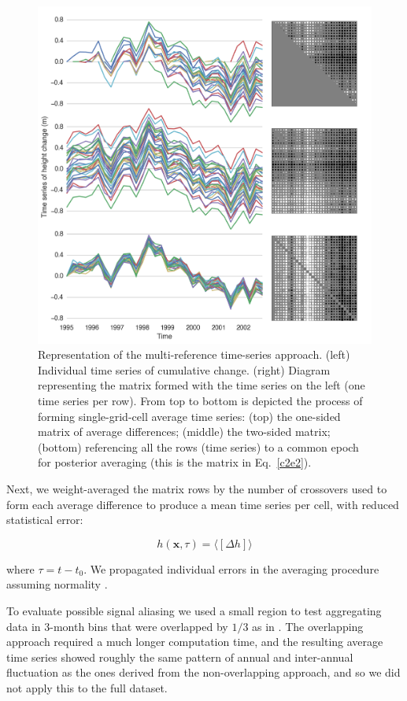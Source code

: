 \begin{figure}[!ht]
  \centering
  \includegraphics[width=.85\textwidth]{img/multiref_matrix_v4.png}
  \caption[Representation of the multi-reference time-series approach]{
  \ssp \footnotesize
  Representation of the multi-reference time-series approach. (left) Individual time series of cumulative change. (right) Diagram representing the matrix formed with the time series on the left (one time series per row). From top to bottom is depicted the process of forming single-grid-cell average time series: (top) the one-sided matrix of average differences; (middle) the two-sided matrix; (bottom) referencing all the rows (time series) to a common epoch for posterior averaging (this is the matrix in Eq.~\ref{c2e2}).} 
  \label{c2f3}
\end{figure}


Next, we weight-averaged the matrix rows by the number of crossovers used to form each average difference to produce a mean time series per cell, with reduced statistical error:

\begin{equation}
  h(\mathbf x, \tau) = \langle [\Delta h] \rangle 
  \label{c2e3}
\end{equation}

\noindent
where $\tau = t - t_0$. We propagated individual errors in the averaging procedure assuming normality \parencite{Li2006}.

To evaluate possible signal aliasing we used a small region to test aggregating data in 3-month bins that were overlapped by $1/3$ as in \textcite{Khvorostovsky2012}. The overlapping approach required a much longer computation time, and the resulting average time series showed roughly the same pattern of annual and inter-annual fluctuation as the ones derived from the non-overlapping approach, and so we did not apply this to the full dataset.

